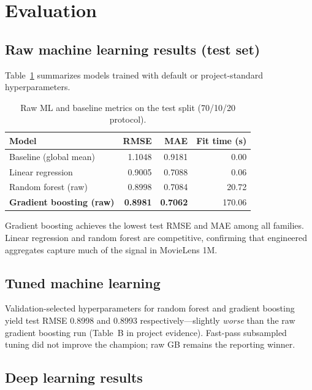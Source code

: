 \section{Evaluation}

\subsection{Raw machine learning results (test set)}

Table~\ref{tab:ml-raw} summarizes models trained with default or project-standard hyperparameters.

\begin{table}[ht]
  \centering
  \caption{Raw ML and baseline metrics on the test split (70/10/20 protocol).}
  \label{tab:ml-raw}
  \begin{tabular}{lrrr}
    \toprule
    Model & RMSE & MAE & Fit time (s) \\
    \midrule
    Baseline (global mean) & 1.1048 & 0.9181 & 0.00 \\
    Linear regression      & 0.9005 & 0.7088 & 0.06 \\
    Random forest (raw)    & 0.8998 & 0.7084 & 20.72 \\
    \textbf{Gradient boosting (raw)} & \textbf{0.8981} & \textbf{0.7062} & 170.06 \\
    \bottomrule
  \end{tabular}
\end{table}

Gradient boosting achieves the lowest test RMSE and MAE among all families.
Linear regression and random forest are competitive, confirming that engineered aggregates capture much of
the signal in MovieLens 1M.

\subsection{Tuned machine learning}

Validation-selected hyperparameters for random forest and gradient boosting yield test RMSE 0.8998 and
0.8993 respectively---slightly \emph{worse} than the raw gradient boosting run (Table~B in project evidence).
Fast-pass subsampled tuning did not improve the champion; raw GB remains the reporting winner.

\subsection{Deep learning results}


